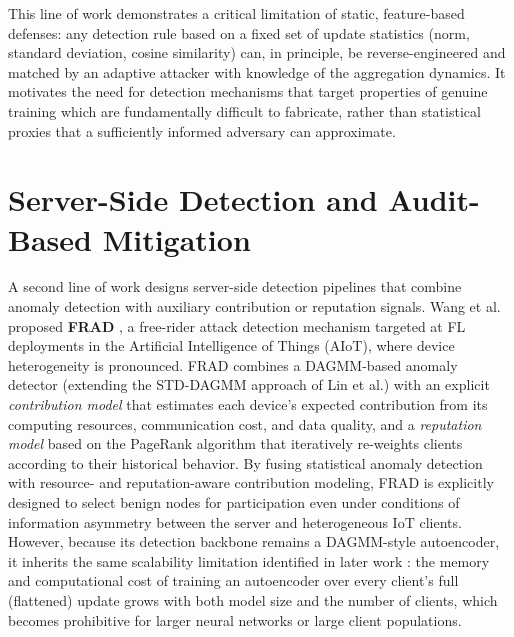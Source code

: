 This line of work demonstrates a critical limitation of static, feature-based defenses: any detection rule based on a fixed set of update statistics (norm, standard deviation, cosine similarity) can, in principle, be reverse-engineered and matched by an adaptive attacker with knowledge of the aggregation dynamics. It motivates the need for detection mechanisms that target properties of genuine training which are fundamentally difficult to fabricate, rather than statistical proxies that a sufficiently informed adversary can approximate.

\section{Server-Side Detection and Audit-Based Mitigation}
\label{subsec:server-side}

A second line of work designs server-side detection pipelines that combine anomaly detection with auxiliary contribution or reputation signals. Wang et al. proposed \textbf{FRAD} \cite{wang2024frad}, a free-rider attack detection mechanism targeted at FL deployments in the Artificial Intelligence of Things (AIoT), where device heterogeneity is pronounced. FRAD combines a DAGMM-based anomaly detector (extending the STD-DAGMM approach of Lin et al.) with an explicit \emph{contribution model} that estimates each device's expected contribution from its computing resources, communication cost, and data quality, and a \emph{reputation model} based on the PageRank algorithm that iteratively re-weights clients according to their historical behavior. By fusing statistical anomaly detection with resource- and reputation-aware contribution modeling, FRAD is explicitly designed to select benign nodes for participation even under conditions of information asymmetry between the server and heterogeneous IoT clients. However, because its detection backbone remains a DAGMM-style autoencoder, it inherits the same scalability limitation identified in later work \cite{recasens2024frida}: the memory and computational cost of training an autoencoder over every client's full (flattened) update grows with both model size and the number of clients, which becomes prohibitive for larger neural networks or large client populations.

